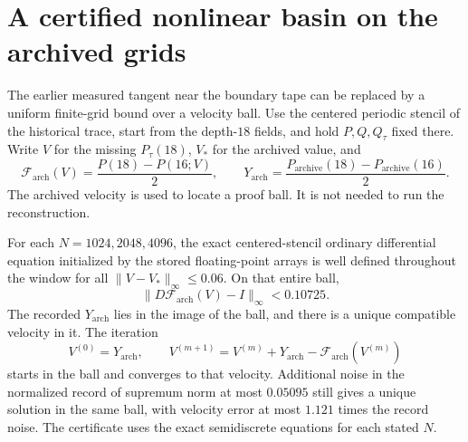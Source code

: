 \section{A certified nonlinear basin on the archived grids}
\label{sec:certified-archive}
The earlier measured tangent near the boundary tape can be
replaced by a uniform finite-grid bound over a velocity ball.
Use the centered periodic stencil of the historical trace,
start from the depth-$18$ fields, and hold $P,Q,Q_\tau$ fixed
there. Write $V$ for the missing $P_\tau(18)$,
$V_*$ for the archived value, and
\[
 \mathcal F_{\mathrm{arch}}(V)
  =\frac{P(18)-P(16;V)}2,\qquad
 Y_{\mathrm{arch}}=\frac{P_{\mathrm{archive}}(18)-
                              P_{\mathrm{archive}}(16)}2 .
\]
The archived velocity is used to locate a proof ball.
It is not needed to run the reconstruction.

\begin{theorem}
\label{th:archive-certificate}
For each $N=1024,2048,4096$, the exact centered-stencil
ordinary differential equation initialized by the stored
floating-point arrays is well defined throughout the
window for all $\|V-V_*\|_\infty\le0.06$.
On that entire ball,
\[
 \|D\mathcal F_{\mathrm{arch}}(V)-I\|_\infty < 0.10725 .
\]
The recorded $Y_{\mathrm{arch}}$ lies in the image of the
ball, and there is a unique compatible velocity in it.
The iteration
\[
 V^{(0)}=Y_{\mathrm{arch}},\qquad
 V^{(m+1)}=V^{(m)}+Y_{\mathrm{arch}}
                         -\mathcal F_{\mathrm{arch}}(V^{(m)})
\]
starts in the ball and converges to that velocity.
Additional noise in the normalized record of supremum
norm at most $0.05095$ still gives a unique solution in
the same ball, with velocity error at most $1.121$
times the record noise. The certificate uses the exact
semidiscrete equations for each stated $N$.
\end{theorem}

